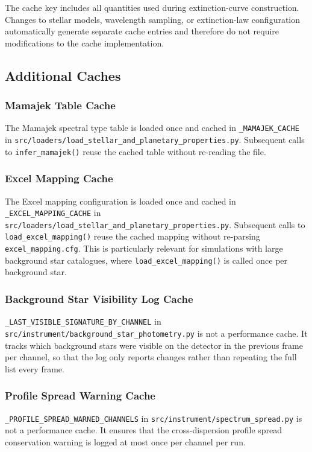 The cache key includes all quantities used during extinction-curve construction. Changes to stellar models, wavelength sampling, or extinction-law configuration automatically generate separate cache entries and therefore do not require modifications to the cache implementation.

\subsection{Additional Caches}

\subsubsection{Mamajek Table Cache}
The Mamajek spectral type table is loaded once and cached in \texttt{\_MAMAJEK\_CACHE} in \texttt{src/loaders/load\allowbreak\_stellar\allowbreak\_and\allowbreak\_planetary\allowbreak\_properties.py}. Subsequent calls to \texttt{infer\_mamajek()} reuse the cached table without re-reading the file.

\subsubsection{Excel Mapping Cache}
The Excel mapping configuration is loaded once and cached in \texttt{\_EXCEL\allowbreak\_MAPPING\allowbreak\_CACHE} in \texttt{src/loaders/load\allowbreak\_stellar\allowbreak\_and\allowbreak\_planetary\allowbreak\_properties.py}. Subsequent calls to \texttt{load\allowbreak\_excel\allowbreak\_mapping()} reuse the cached mapping without re-parsing \texttt{excel\allowbreak\_mapping.cfg}. This is particularly relevant for simulations with large background star catalogues, where \texttt{load\allowbreak\_excel\allowbreak\_mapping()} is called once per background star.

\subsubsection{Background Star Visibility Log Cache}
\texttt{\_LAST\_VISIBLE\_SIGNATURE\_BY\_CHANNEL} in \texttt{src/instrument/background\allowbreak\_star\allowbreak\_photometry.py} is not a performance cache. It tracks which background stars were visible on the detector in the previous frame per channel, so that the log only reports changes rather than repeating the full list every frame.

\subsubsection{Profile Spread Warning Cache}
\texttt{\_PROFILE\_SPREAD\_WARNED\_CHANNELS} in \texttt{src/instrument/spectrum\allowbreak\_spread.py} is not a performance cache. It ensures that the cross-dispersion profile spread conservation warning is logged at most once per channel per run.


